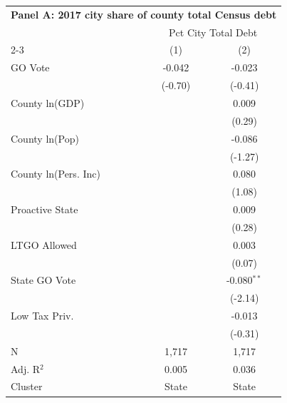 \begingroup
\centering
\begin{tabular*}{\textwidth}{@{\extracolsep{\fill}}lcc}
\multicolumn{3}{l}{\textbf{Panel A: 2017 city share of county total Census debt}}\\

\addlinespace
   \toprule
    & \multicolumn{2}{c}{Pct City Total Debt}\\
   \cmidrule(lr){2-3}
                        & (1)      & (2)\\  
   \midrule 
   GO Vote              & -0.042   & -0.023\\   
                        & (-0.70) & (-0.41)\\   
   County ln(GDP)       &          & 0.009\\   
                        &          & (0.29)\\   
   County ln(Pop)       &          & -0.086\\   
                        &          & (-1.27)\\   
   County ln(Pers. Inc) &          & 0.080\\   
                        &          & (1.08)\\   
   Proactive State      &          & 0.009\\   
                        &          & (0.28)\\   
   LTGO Allowed         &          & 0.003\\   
                        &          & (0.07)\\   
   State GO Vote        &          & -0.080$^{**}$\\   
                        &          & (-2.14)\\   
   Low Tax Priv.        &          & -0.013\\   
                        &          & (-0.31)\\   
   \hline
   N         & 1,717    & 1,717\\  
   Adj. R$^2$       & 0.005    & 0.036\\  
   Cluster              & State & State\\  
   \bottomrule
\end{tabular*}
\par\endgroup
